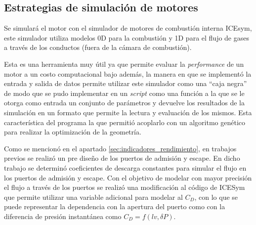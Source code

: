 \subsection{Estrategias de simulación de motores}
%
Se simulará el motor con el simulador de motores de combustión interna ICEsym,
este simulador utiliza modelos 0D para la combustión y 1D para el flujo de
gases a través de los conductos (fuera de la cámara de combustión).

Esta es una herramienta muy útil ya que permite evaluar la \emph{performance} de
un motor a un costo computacional bajo además, la manera en que se implementó la
entrada y salida de datos permite utilizar este simulador como una ``caja
negra'' de modo que se pudo implementar en un \emph{script} como una función a
la que se le otorga como entrada un conjunto de parámetros y devuelve los
resultados de la simulación en un formato que permite la lectura y evaluación de
los mismos.
%
Esta característica del programa la que permitió acoplarlo con un algoritmo
genético para realizar la optimización de la geometría.


Como se mencionó en el apartado \ref{sec:indicadores_rendimiento}, en trabajos
previos se realizó un pre diseño de los puertos de admisión y escape.
%
En dicho trabajo se determinó coeficientes de descarga constantes
para simular el flujo en los puertos de admisión y escape.
%
Con el objetivo de modelar con mayor precisión el flujo a través de los puertos
se realizó una modificación al código de ICESym que permite utilizar una
variable adicional para modelar al $C_D$, con lo que se puede representar la
dependencia con la apertura del puerto como con la diferencia de presión
instantánea como $C_D = f(lv, \delta P)$.

